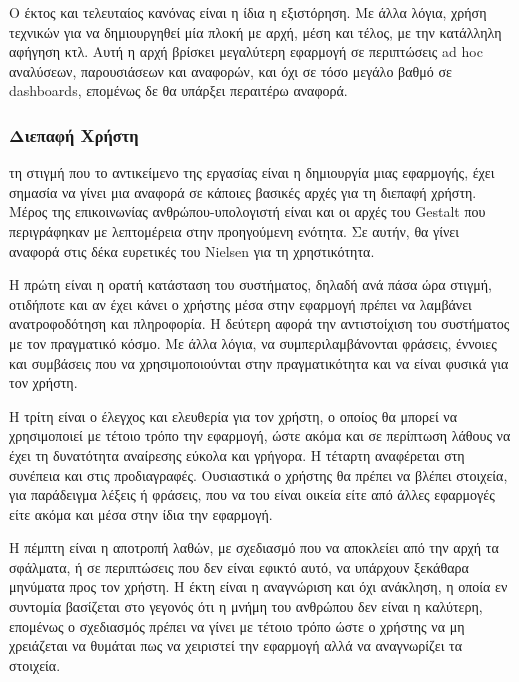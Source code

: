 \documentclass{article}
\begin{document}
Ο έκτος και τελευταίος κανόνας είναι η ίδια η εξιστόρηση. Με άλλα λόγια, χρήση τεχνικών για να δημιουργηθεί μία πλοκή με αρχή, μέση και τέλος, με την κατάλληλη αφήγηση κτλ. \cite{knaflic2015storytelling} Αυτή η αρχή βρίσκει μεγαλύτερη εφαρμογή σε περιπτώσεις ad hoc αναλύσεων, παρουσιάσεων και αναφορών, και όχι σε τόσο μεγάλο βαθμό σε dashboards, επομένως δε θα υπάρξει περαιτέρω αναφορά.

\subsubsection{Διεπαφή Χρήστη}

 τη στιγμή που το αντικείμενο της εργασίας είναι η δημιουργία μιας εφαρμογής, έχει σημασία να γίνει μια αναφορά σε κάποιες βασικές αρχές για τη διεπαφή χρήστη. Μέρος της επικοινωνίας ανθρώπου-υπολογιστή είναι και οι αρχές του Gestalt που περιγράφηκαν με λεπτομέρεια στην προηγούμενη ενότητα. Σε αυτήν, θα γίνει αναφορά στις δέκα ευρετικές του Nielsen για τη χρηστικότητα. \cite{nielsen1994enhancing}

Η πρώτη είναι η ορατή κατάσταση του συστήματος, δηλαδή ανά πάσα ώρα στιγμή, οτιδήποτε και αν έχει κάνει ο χρήστης μέσα στην εφαρμογή πρέπει να λαμβάνει ανατροφοδότηση και πληροφορία. Η δεύτερη αφορά την αντιστοίχιση του συστήματος με τον πραγματικό κόσμο. Με άλλα λόγια, να συμπεριλαμβάνονται φράσεις, έννοιες και συμβάσεις που να χρησιμοποιούνται στην πραγματικότητα και να είναι φυσικά για τον χρήστη.

Η τρίτη είναι ο έλεγχος και ελευθερία για τον χρήστη, ο οποίος θα μπορεί να χρησιμοποιεί με τέτοιο τρόπο την εφαρμογή, ώστε ακόμα και σε περίπτωση λάθους να έχει τη δυνατότητα αναίρεσης εύκολα και γρήγορα. Η τέταρτη αναφέρεται στη συνέπεια και στις προδιαγραφές. Ουσιαστικά ο χρήστης θα πρέπει να βλέπει στοιχεία, για παράδειγμα λέξεις ή φράσεις, που να του είναι οικεία είτε από άλλες εφαρμογές είτε ακόμα και μέσα στην ίδια την εφαρμογή.

Η πέμπτη είναι η αποτροπή λαθών, με σχεδιασμό που να αποκλείει από την αρχή τα σφάλματα, ή σε περιπτώσεις που δεν είναι εφικτό αυτό, να υπάρχουν ξεκάθαρα μηνύματα προς τον χρήστη. Η έκτη είναι η αναγνώριση και όχι ανάκληση, η οποία εν συντομία βασίζεται στο γεγονός ότι η μνήμη του ανθρώπου δεν είναι η καλύτερη, επομένως ο σχεδιασμός πρέπει να γίνει με τέτοιο τρόπο ώστε ο χρήστης να μη χρειάζεται να θυμάται πως να χειριστεί την εφαρμογή αλλά να αναγνωρίζει τα στοιχεία.
\end{document}
